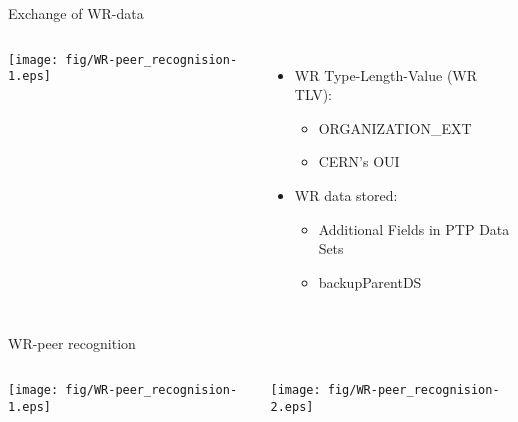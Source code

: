 \documentclass[compress,red]{beamer}
\begin{document}
\begin{frame}{Exchange of WR-data}

  \begin{columns}[c]

    \begin{center}
    \texttt{[image: fig/WR-peer\_recognision-1.eps]}
    \end{center}


      \begin{itemize}
	\item WR Type-Length-Value (WR TLV):
	  \begin{itemize}
	    \item ORGANIZATION\_EXT
	    \item CERN's OUI
	  \end{itemize}
 	\vspace{0.5cm}
	\item WR data stored:
	  \begin{itemize}
	    \item Additional Fields in PTP Data Sets
	    \item backupParentDS
	  \end{itemize}
      \end{itemize}

  \end{columns}


\end{frame}
\begin{frame}{WR-peer recognition}

  \begin{columns}[c]

    \begin{center}
    \texttt{[image: fig/WR-peer\_recognision-1.eps]}
    \end{center}


    \begin{center}
    \texttt{[image: fig/WR-peer\_recognision-2.eps]}
    \end{center}

  \end{columns}

\end{frame}
\end{document}

